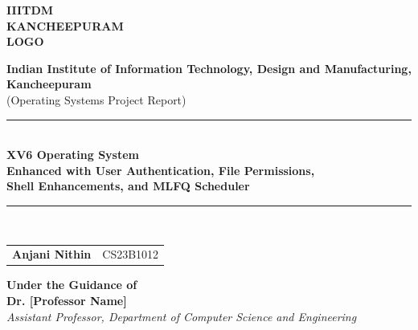 \documentclass[a4paper,12pt]{report}
\begin{document}
\begin{titlepage}
\thispagestyle{firstpage}
\begin{center}

\begin{center}
\begin{tcolorbox}[colback=blue!5, colframe=blue!40, width=0.3\textwidth, height=4cm]
\centering
\vfill
\textbf{IIITDM}\\
\textbf{KANCHEEPURAM}\\
\textbf{LOGO}
\vfill
\end{tcolorbox}
\vspace{0.5cm}
\end{center}

{\LARGE \textbf{Indian Institute of Information Technology, Design and Manufacturing, Kancheepuram}}\\[0.5cm]
{\large (Operating Systems Project Report)}\\[3cm]

\rule{\linewidth}{0.5pt}\\[0.4cm]
{\Huge \textbf{XV6 Operating System}}\\[0.3cm]
{\Large \textbf{Enhanced with User Authentication, File Permissions,}}\\[0.2cm]
{\Large \textbf{Shell Enhancements, and MLFQ Scheduler}}\\[0.3cm]
\rule{\linewidth}{0.5pt}\\[2cm]

\begin{minipage}{0.9\textwidth}
\centering
\begin{tabular}{ll}
\textbf{Anjani Nithin} & CS23B1012 \\
\end{tabular}
\end{minipage}

\vfill

\textbf{Under the Guidance of}\\[0.2cm]
\textbf{Dr. [Professor Name]}\\[0.2cm]
\textit{Assistant Professor, Department of Computer Science and Engineering}\\[0.5cm]

\end{center}
\end{titlepage}

\end{document}
